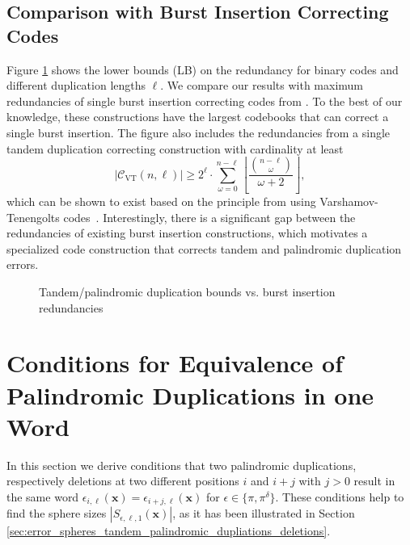 \documentclass[a4paper]{llncs}
\newcommand{\ve}[1]{\boldsymbol{#1}}
\begin{document}
	\subsection{Comparison with Burst Insertion Correcting Codes}
	Figure \ref{fig:bounds_vs_burst} shows the lower bounds (LB) on the redundancy for binary codes and different duplication lengths $\ell$. We compare our results with maximum redundancies of single burst insertion correcting codes from \cite{Schoeny17}. To the best of our knowledge, these constructions have the largest codebooks that can correct a single burst insertion. The figure also includes the redundancies from a single tandem duplication correcting construction with cardinality at least
	\[|\mathcal{C}_\mathrm{VT}(n,\ell)| \geq 2^\ell \cdot \sum\limits_{\omega=0}^{n-\ell} \left\lfloor {\frac{\binom{n-\ell}{\omega}}{\omega+2}}\right\rfloor,\]
	which can be shown to exist based on the principle from \cite{Jain16} using Varshamov-Tenengolts codes~\cite{Varshamov65}. Interestingly, there is a significant gap between the redundancies of existing burst insertion constructions, which motivates a specialized code construction that corrects tandem and palindromic duplication errors.
	\begin{figure}[htp]
		\centering
		
		\caption{Tandem/palindromic duplication bounds vs. burst insertion redundancies}
		\label{fig:bounds_vs_burst}
	\end{figure}
	
	\appendix
	
	\section{Conditions for Equivalence of Palindromic Duplications in one Word} \label{sec:conditions_equivalence_palindromic_duplications}
	In this section we derive conditions that two palindromic duplications, respectively deletions at two different positions $i$ and $i+j$ with $j > 0$ result in the same word $\epsilon_{i,\ell}(\ve{x}) = \epsilon_{i+j,\ell}(\ve{x})$ for $\epsilon \in \{\pi, \pi^\delta\}$. These conditions help to find the sphere sizes $|S_{\epsilon, \ell, 1}(\ve{x})|$, as it has been illustrated in Section \ref{sec:error_spheres_tandem_palindromic_dupliations_deletions}.
\end{document}
